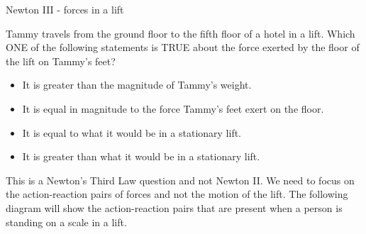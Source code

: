 \begin{wex}{Newton III - forces in a lift}
{Tammy travels from the ground floor to the fifth floor of a hotel in a lift. Which ONE of the following statements is TRUE about the force exerted by the floor of the lift on Tammy's feet?
	\begin{itemize} 
	\item[A] It is greater than the magnitude of Tammy's weight.
	\item[B] It is equal in magnitude to the force Tammy's feet exert on the floor.
	\item[C] It is equal to what it would be in  a stationary lift.
	\item[D] It is greater than what it would be in a stationary lift.
	\end{itemize}}
{
This is a Newton's Third Law question and not Newton II. We need to focus on the action-reaction pairs of forces and not the motion of the lift. The following diagram will show the action-reaction pairs that are present when a person is standing on a scale in a lift.

}
\end{wex}
